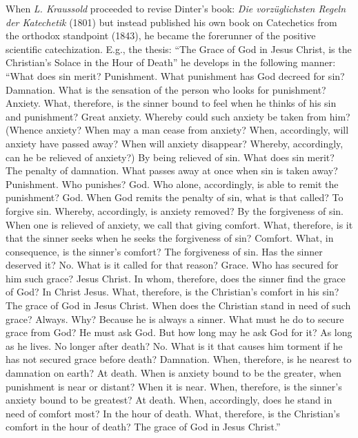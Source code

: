 When \emph{L. Kraussold} proceeded to revise Dinter’s book: \emph{Die vorzüglichsten Regeln der Katechetik} (1801) but instead published his own book on Catechetics from the orthodox standpoint (1843), he became the forerunner of the positive scientific catechization. E.g., the thesis: “The Grace of God in Jesus Christ, is the Christian’s Solace in the Hour of Death” he develops in the following manner: “What does sin merit? Punishment. What punishment has God decreed for sin? Damnation. What is the sensation of the person who looks for punishment? Anxiety. What, therefore, is the sinner bound to feel when he thinks of his sin and punishment? Great anxiety. Whereby could such anxiety be taken from him? (Whence anxiety? When may a man cease from anxiety? When, accordingly, will anxiety have passed away? When will anxiety disappear? Whereby, accordingly, can he be relieved of anxiety?) By being relieved of sin. What does sin merit? The penalty of damnation. What passes away at once when sin is taken away? Punishment. Who punishes? God. Who alone, accordingly, is able to remit the punishment? God. When God remits the penalty of sin, what is that called? To forgive sin. Whereby, accordingly, is anxiety removed?
By the forgiveness of sin. When one is relieved of anxiety, we call that giving comfort. What, therefore, is it that the sinner seeks when he seeks the forgiveness of sin? Comfort. What, in consequence, is the sinner’s comfort? The forgiveness of sin. Has the sinner deserved it? No. What is it called for that reason? Grace. Who has secured for him such grace? Jesus Christ. In whom, therefore, does the sinner find the grace of God? In Christ Jesus. What, therefore, is the Christian’s comfort in his sin? The grace of God in Jesus Christ. When does the Christian stand in need of such grace? Always. Why? Because he is always a sinner. What must he do to secure grace from God? He must ask God. But how long may he ask God for it? As long as he lives. No longer after death? No. What is it that causes him torment if he has not secured grace before death? Damnation. When, therefore, is he nearest to damnation on earth? At death. When is anxiety bound to be the greater, when punishment is near or distant? When it is near. When, therefore, is the sinner’s anxiety bound to be greatest? At death. When, accordingly, does he stand in need of comfort most? In the hour of death. What, therefore, is the Christian’s comfort in the hour of death? The grace of God in Jesus Christ.”

